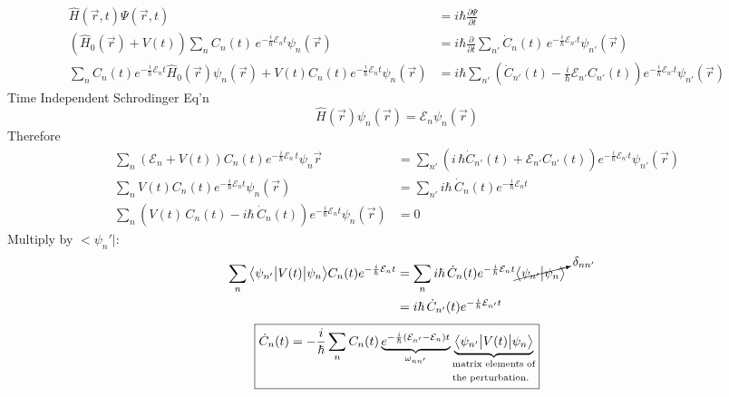 \documentclass[12pt,fancychapters]{report}
\numberwithin{equation}{section}
\begin{document}
\begin{align*}
  \hat{H}(\vec{r}, t)\Psi(\vec{r}, t) &= i\hbar \frac{\partial \Psi}{\partial t}\\
  \left(\hat{H}_0(\vec{r}) + V(t)\right)\sum_n C_n(t)\,e^{-\frac{i}{\hbar}\mathcal{E}_n t}
  \psi_n(\vec{r}) &= i\hbar\frac{\partial}{\partial t}\sum_{n'} \dot{C}_n(t) 
  \,e^{-\frac{i}{\hbar}\mathcal{E}_{n'}t}\psi_{n'}(\vec{r})\\
  \sum_n C_n(t)e^{-\frac{i}{\hbar}\mathcal{E}_{n}t}\hat{H}_0(\vec{r})\psi_n(\vec{r}) + V(t)
  C_n(t)e^{-\frac{i}{\hbar}\mathcal{E}_{n}t}\psi_n(\vec{r}) &= i\hbar \sum_{n'}
  \left(\dot{C}_{n'}(t) - \frac{i}{\hbar}\mathcal{E}_{n'}C_{n'}(t) \right)e^{-\frac{i}{\hbar}
  \mathcal{E}_{n'}t}\psi_{n'}(\vec{r})
\end{align*}
Time Independent Schrodinger Eq'n
\[
  \hat{H}(\vec{r})\psi_n(\vec{r}) = \mathcal{E}_n\psi_n(\vec{r})
\]
Therefore 
\begin{align*}
  \sum_n\left(\mathcal{E}_n + V(t) \right)C_n(t) e^{-\frac{i}{\hbar}\mathcal{E}_n\,t}\psi_n{\vec{r}}
  &= \sum_{n'}\left(i\,\hbar\dot{C}_{n'}(t) + \mathcal{E}_{n'}C_{n'}(t)\right) e^{-\frac{i}{\hbar}
  \mathcal{E}_{n'}t}\psi_{n'}(\vec{r})\\
  \sum_n V(t)C_n(t) e^{-\frac{i}{\hbar}\mathcal{E}_nt}\psi_n(\vec{r}) &= 
  \sum_{n'}i\hbar \,\dot{C}_{n}(t) e^{-\frac{i}{\hbar}\mathcal{E}_n t}\\
  \sum_n\left(V(t)\,C_n(t)- i\hbar\,\dot{C}_n(t)\right)e^{-\frac{i}{\hbar}\mathcal{E}_n t}
  \psi_n(\vec{r})&= 0
\end{align*}
Multiply by $\big<\psi_n'\big|$:
\begin{align*}
  \sum_n \big<\psi_{n'}\big|V(t)\big|\psi_n\big>C_n(t)e^{-\frac{i}{\hbar}\mathcal{E}_n t} 
  &= \sum_n i\hbar\,\dot{C}_n(t)e^{-\frac{i}{\hbar}\mathcal{E}_n t}\cancelto{\delta_{nn'}}{
    \big<\psi_{n'}\big|\psi_n\big>
  }\\
  &= i\hbar\,\dot{C}_{n'}(t)e^{-\frac{i}{\hbar}\mathcal{E}_{n'} t}
\end{align*}
\[\boxed{
  \dot{C}_n(t) =-\frac{i}{\hbar}\sum_n C_n(t)\underbrace{e^{-\frac{i}{\hbar}\left(\mathcal{E}
        _{n'}-
  \mathcal{E}_n\right)t}}_{\omega_{nn'}}\underbrace{\big<\psi_{n'}\big|V(t)\big|\psi_n\big>}_
  {\scriptsize  \begin{split}
    &\text{matrix elements of}\\
    &\text{the perturbation.}\end{split}}
}\]
\end{document}
